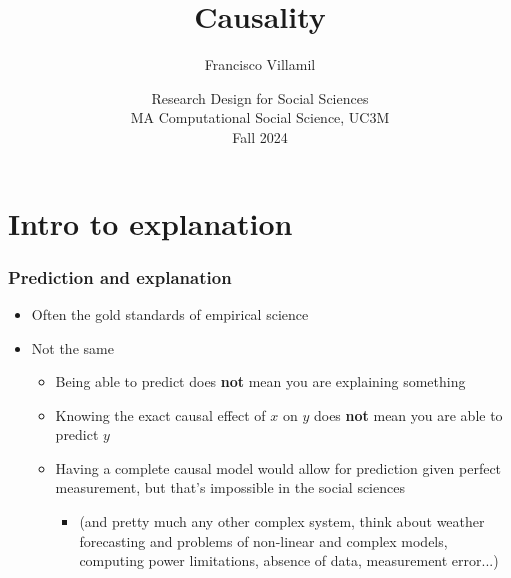 \documentclass[aspectratio=43]{beamer}
\title[Lecture 3: Causality]{\Large Causality}
\author[]{Francisco Villamil}
\date[]{Research Design for Social Sciences\\MA Computational Social Science, UC3M\\Fall 2024}
\begin{document}

\begin{frame}
  \titlepage
\end{frame}

%
%

\section{Intro to explanation}

\begin{frame}
\frametitle{Prediction and explanation}
\centering

\begin{itemize}
  \item Often the gold standards of empirical science
  \item Not the same
  \begin{itemize}
    \item Being able to predict does \textbf{not} mean you are explaining something
    \item Knowing the exact causal effect of $x$ on $y$ does \textbf{not} mean you are able to predict $y$
    \item Having a complete causal model would allow for prediction given perfect measurement, but that's impossible in the social sciences
    \begin{itemize}
      \item[] (and pretty much any other complex system, think about weather forecasting and problems of non-linear and complex models, computing power limitations, absence of data, measurement error...)
    \end{itemize}
  \end{itemize}
\end{itemize}

\end{frame}
\end{document}

